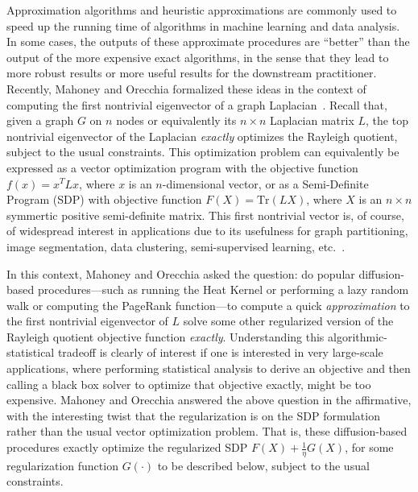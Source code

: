 \documentclass[12pt]{article}
\theoremstyle{plain}
\begin{document}
Approximation algorithms and heuristic approximations are commonly used to
speed up the running time of algorithms in machine learning and data
analysis.
In some cases, the outputs of these approximate procedures are ``better''
than the output of the more expensive exact algorithms, in the sense that
they lead to more robust results or more useful results for the downstream
practitioner.
Recently, Mahoney and Orecchia formalized these ideas in the context of
computing the first nontrivial eigenvector of a graph
Laplacian~\cite{mahoney2010implementing}.
Recall that, given a graph $G$ on $n$ nodes or equivalently its $n \times n$
Laplacian matrix $L$, the top nontrivial eigenvector of the Laplacian
\emph{exactly} optimizes the Rayleigh quotient, subject to the usual
constraints.
This optimization problem can equivalently be expressed as a vector
optimization program with the objective function $f(x) = x^TLx$,
where $x$ is an $n$-dimensional vector, or as a Semi-Definite Program (SDP)
with objective function $F(X)=\mathrm{Tr}(L X)$, where $X$ is an $n \times n$
symmertic positive semi-definite matrix.
This first nontrivial vector is, of course, of widespread interest in
applications due to its usefulness for graph partitioning, image
segmentation, data clustering, semi-supervised learning, etc.~\cite{spielman96_spectral,guatterymiller98,ShiMalik00_NCut,BN03,Joa03,LLDM09_communities_IM}.

In this context, Mahoney and Orecchia asked the question: do popular
diffusion-based procedures---such as running the Heat Kernel or performing a
lazy random walk or computing the PageRank function---to compute a quick
\emph{approximation} to the first nontrivial eigenvector of $L$ solve some
other regularized version of the Rayleigh quotient objective function
\emph{exactly}.
Understanding this algorithmic-statistical tradeoff is clearly of interest
if one is interested in very large-scale applications, where performing
statistical analysis to derive an objective and then calling a black box
solver to optimize that objective exactly, might be too expensive.
Mahoney and Orecchia answered the above question in the affirmative, with
the interesting twist that the regularization is on the SDP formulation
rather than the usual vector optimization problem.
That is, these diffusion-based procedures exactly optimize the regularized
SDP $F(X)+ \tfrac{1}{\eta} G(X)$, for some regularization function $G(\cdot)$ to be
described below, subject to the usual constraints.
\end{document}
